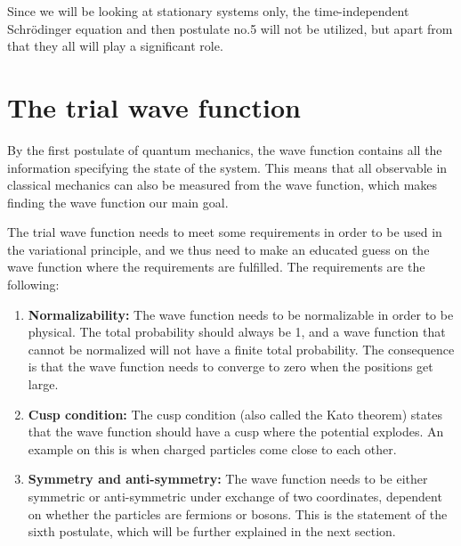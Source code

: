 Since we will be looking at stationary systems only, the time-independent Schrödinger equation and then postulate no.5 will not be utilized, but apart from that they all will play a significant role. 

\section{The trial wave function} \label{sec:wavefunction}
By the first postulate of quantum mechanics, the wave function contains all the information specifying the state of the system. This means that all observable in classical mechanics can also be measured from the wave function, which makes finding the wave function our main goal.

The trial wave function needs to meet some requirements in order to be used in the variational principle, and we thus need to make an educated guess on the wave function where the requirements are fulfilled. The requirements are the following:

\begin{enumerate}
	\item \textbf{Normalizability:} The wave function needs to be normalizable in order to be physical. The total probability should always be 1, and a wave function that cannot be normalized will not have a finite total probability. The consequence is that the wave function needs to converge to zero when the positions get large. 
	
	\item \textbf{Cusp condition:} The cusp condition (also called the Kato theorem) states that the wave function should have a cusp where the potential explodes. An example on this is when charged particles come close to each other. 
	
	\item \textbf{Symmetry and anti-symmetry:} The wave function needs to be either symmetric or anti-symmetric under exchange of two coordinates, dependent on whether the particles are fermions or bosons. This is the statement of the sixth postulate, which will be further explained in the next section.
\end{enumerate}

